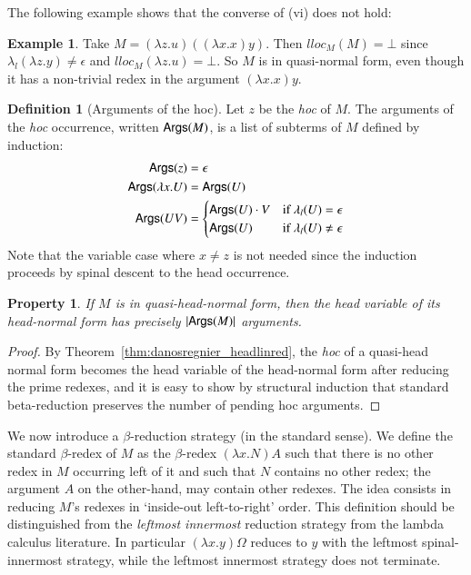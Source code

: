 \documentclass{elsarticle}
\theoremstyle{plain}
\newtheorem{property}[theorem]{Property}
\theoremstyle{definition}
\newtheorem{definition}{Definition}[section]
\newtheorem{example}{Example}[section]
\theoremstyle{remark}
\begin{document}
The following example shows that the converse of (vi) does not hold:
\begin{example}
Take $M= (\lambda z.u)((\lambda x . x) y)$. Then $lloc_M(M) = \bot$ since $\lambda_l(\lambda z.y)\ne\epsilon$ and $lloc_M(\lambda z.u) = \bot$.
So $M$ is in quasi-normal form, even though it has a non-trivial redex in the argument $(\lambda x . x) y$.
\end{example}

\begin{definition}[Arguments of the hoc]
Let $z$ be the \emph{hoc} of $M$. The arguments of the \emph{hoc} occurrence, written ${\sf Args}(M)$, is a list of subterms of $M$ defined by induction:
\begin{align*}
{\sf Args}(z) &= \epsilon \\
{\sf Args}(\lambda x . U ) &= {\sf Args}(U) \\
{\sf Args}(U V) &= \begin{cases}
             {\sf Args}(U) \cdot V & \mbox{if } \lambda_l(U) = \epsilon\\
             {\sf Args}(U)         & \mbox{if } \lambda_l(U) \neq \epsilon
            \end{cases}
\end{align*}
Note that the variable case where $x\neq z$ is not needed since the induction proceeds by spinal descent to the head occurrence.
\end{definition}

\begin{property}
\label{property:hoc_argument_count_in_headnf}
    If $M$ is in quasi-head-normal form, then the head variable of its head-normal form has precisely $|{\sf Args}(M)|$ arguments.
\end{property}
\begin{proof}
By Theorem~\ref{thm:danosregnier_headlinred}, the \emph{hoc} of a quasi-head normal form becomes the head variable of the head-normal form after reducing the prime redexes, and it is easy to show by structural induction that standard beta-reduction preserves the number of pending hoc arguments.
\end{proof}

We now introduce a $\beta$-reduction strategy (in the standard sense).
We define the  standard $\beta$-redex of $M$ as the $\beta$-redex $(\lambda x . N) A$ such that there is no other redex in $M$ occurring left of it and such that $N$ contains no other redex; the argument $A$ on the other-hand, may contain other redexes.
The idea consists in reducing $M$'s redexes in `inside-out left-to-right' order.
This definition should be distinguished from the \emph{leftmost innermost} reduction strategy from the lambda calculus literature.
In particular $(\lambda x . y) \Omega$ reduces to $y$ with the leftmost spinal-innermost strategy, while the leftmost innermost strategy does not terminate.
\end{document}
